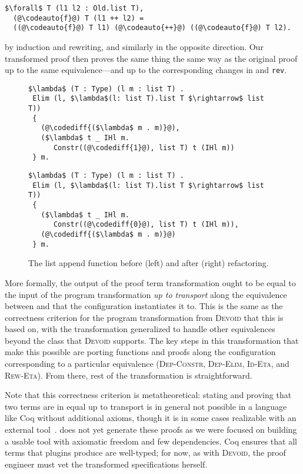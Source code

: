 \begin{lstlisting}
$\forall$ T (l1 l2 : Old.list T),
  (@\codeauto{f}@) T (l1 ++ l2) =
  ((@\codeauto{f}@) T l1) (@\codeauto{++}@) ((@\codeauto{f}@) T l2).
\end{lstlisting}
by induction and rewriting, and similarly in the opposite direction.
Our transformed proof  then proves the same thing the same way
as the original proof up to the same equivalence---and up to the corresponding changes in \codeauto{\lstinline{++}}
and \lstinline{rev}.

\begin{figure}
\begin{minipage}{0.48\textwidth}
\begin{lstlisting}
$\lambda$ (T : Type) (l m : list T) .
 Elim (l, $\lambda$(l: list T).list T $\rightarrow$ list T))
 {
   (@\codediff{($\lambda$ m . m)}@),
   ($\lambda$ t _ IHl m.
      Constr((@\codediff{1}@), list T) t (IHl m))
 } m.
\end{lstlisting}
\end{minipage}
\hfill
\begin{minipage}{0.48\textwidth}
\begin{lstlisting}
$\lambda$ (T : Type) (l m : list T) .
 Elim (l, $\lambda$(l: list T).list T $\rightarrow$ list T))
 {
   ($\lambda$ t _ IHl m.
      Constr((@\codediff{0}@), list T) t (IHl m)),
   (@\codediff{($\lambda$ m . m)}@)
 } m.
\end{lstlisting}
\end{minipage}
\caption{The list append function before (left) and after (right) refactoring.}
\label{fig:appswap1}
\end{figure}

More formally, the output of the proof term transformation ought to be equal to the input of the program transformation
\textit{up to transport} along the equivalence between \A and \B that the configuration instantiates it to.
This is the same as the correctness criterion for the program transformation from \textsc{Devoid} that this is based on,
with the transformation generalized to handle other equivalences beyond the class that \textsc{Devoid} supports.
The key steps in this transformation that make this possible are porting functions and proofs along the configuration corresponding
to a particular equivalence (\textsc{Dep-Constr}, \textsc{Dep-Elim}, \textsc{Id-Eta}, and \textsc{Rew-Eta}).
From there, rest of the transformation is straightforward.

Note that this correctness criterion is metatheoretical:
stating and proving that two terms are in equal up to transport is in general not possible in a language like Coq
without additional axioms, though it is in some cases realizable with an external tool~\cite{tabareau2017equivalences}.
\toolname does not yet generate these proofs as we were focused on building a usable tool with axiomatic freedom and few dependencies.
Coq ensures that all terms that plugins produce are well-typed; for now, as with \textsc{Devoid}, the proof engineer must vet the transformed
specifications herself.

